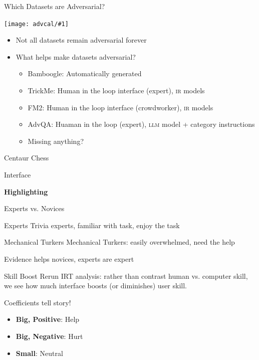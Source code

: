 \documentclass[compress]{beamer}
\newcommand{\abr}[1]{\textsc{#1} }
\newcommand{\fsi}[2]{
\begin{frame}[plain]
\vspace*{-1pt}
\makebox[\linewidth]{\texttt{[image: \#1]}}
\begin{center}
#2
\end{center}
\end{frame}
}
\newcommand{\gfxa}[2]{
	\begin{center}
		\texttt{[image: advcal/\#1]}
	\end{center}
}
\begin{document}

\begin{frame}{Which Datasets are Adversarial?}
	\gfxa{cumulative_advscore}{.9}
	
	\begin{itemize}
		\item Not all datasets remain adversarial forever
		\item What helps make datasets adversarial?
		\begin{itemize}
			\item Bamboogle: Automatically generated          
			\item TrickMe: Human in the loop interface (expert), \abr{ir} models
			\item FM2: Human in the loop interface (crowdworker), \abr{ir} models
			\item AdvQA: Huaman in the loop (expert), \abr{llm} model + category instructions
			\pause
			\item Missing anything?
		\end{itemize}
		
	\end{itemize}
\end{frame}
\fi


\fsi{simtrans/centaur-chess}{Centaur Chess}

\fsi{qb/augment/screenshot_all}{Interface}

\fsi{qb/augment/screenshot_guesses}{}

\fsi{qb/augment/screenshot_highlight}{{\bf Highlighting}}

\fsi{qb/augment/screenshot_evidence}{}

\begin{frame}{Experts vs. Novices}
	
	\begin{block}{Experts}
		Trivia experts, familiar with task, enjoy the task
	\end{block}
	
	\begin{block}{Mechanical Turkers}
		Mechanical Turkers: easily overwhelmed, need the help
	\end{block}
	
\end{frame}

\fsi{qb/augment/tools_acc}{Evidence helps novices, experts are expert}

\begin{frame}{Skill Boost}
	Rerun IRT analysis: rather than contrast human vs. computer skill,
	we see how much interface boosts (or diminishes) user skill.
	\pause
	
	\begin{block}{Coefficients tell story!}
		\begin{itemize}
			\item {\bf Big, Positive}: Help
			\item {\bf Big, Negative}: Hurt
			\item {\bf Small}: Neutral
		\end{itemize}
	\end{block}
	
\end{frame}
\end{document}
